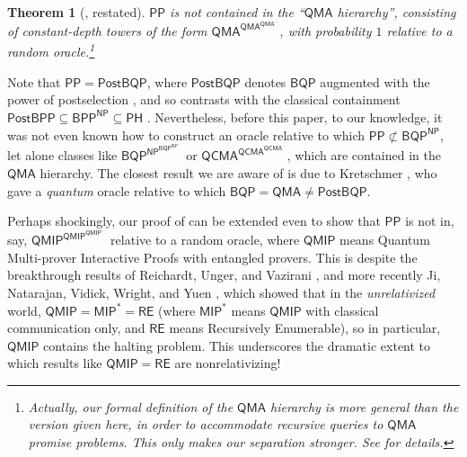 \documentclass[10pt,a4paper]{article}
\newtheorem{theorem}{Theorem}
\begin{document}
\begin{theorem}[, restated]
\label{thm:pp_not_in_qmah_intro}
$\mathsf{PP}$ is not contained in the \emph{``$\mathsf{QMA}$ hierarchy''}, consisting of constant-depth towers of the form $\mathsf{QMA}^{\mathsf{QMA}^{\mathsf{QMA}^{\cdots}}}$, with probability $1$ relative to a random oracle.\footnote{Actually, our formal definition of the $\mathsf{QMA}$ hierarchy is more general than the version given here, in order to accommodate recursive queries to $\mathsf{QMA}$ promise problems. This only makes our separation stronger. See  for details.}
\end{theorem}

Note that $\mathsf{PP} = \mathsf{PostBQP}$, where $\mathsf{PostBQP}$ denotes $\mathsf{BQP}$ augmented with the power of postselection \cite{Aar05}, and so  contrasts with the classical containment $\mathsf{PostBPP} \subseteq \mathsf{BPP}^\mathsf{NP} \subseteq \mathsf{PH}$ \cite{HHT97,Kup15}. Nevertheless, before this paper, to our knowledge, it was not even known how to
construct an oracle relative to which $\mathsf{PP} \not\subset \mathsf{BQP}^\mathsf{NP}$, let alone classes like $\mathsf{BQP}^{\mathsf{NP}^{\mathsf{BQP}^{\mathsf{NP}^{\cdots}}}}$ or $\mathsf{QCMA}^{\mathsf{QCMA}^{\mathsf{QCMA}^{\cdots}}}$, which are contained in the $\mathsf{QMA}$ hierarchy. The closest result we are aware of is due to Kretschmer \cite{Kre21c}, who gave a \textit{quantum} oracle relative to which $\mathsf{BQP} = \mathsf{QMA} \neq \mathsf{PostBQP}$.

Perhaps shockingly, our proof of  can be extended even to show that $\mathsf{PP}$ is not in, say, $\mathsf{QMIP}^{\mathsf{QMIP}^{\mathsf{QMIP}^{\cdots}}}$ relative to a random oracle, where $\mathsf{QMIP}$ means Quantum Multi-prover Interactive Proofs with entangled provers.  This is despite the breakthrough results of Reichardt, Unger, and Vazirani \cite{RUV13}, and more recently Ji, Natarajan, Vidick, Wright, and Yuen \cite{JNVWY20}, which showed that in the \textit{unrelativized} world, $\mathsf{QMIP} = \mathsf{MIP}^* = \mathsf{RE}$ (where $\mathsf{MIP}^*$ means $\mathsf{QMIP}$ with classical communication only, and $\mathsf{RE}$ means Recursively Enumerable), so in particular, $\mathsf{QMIP}$ contains the halting problem.  This underscores the dramatic extent to which results like $\mathsf{QMIP} = \mathsf{RE}$ are nonrelativizing!
\end{document}

